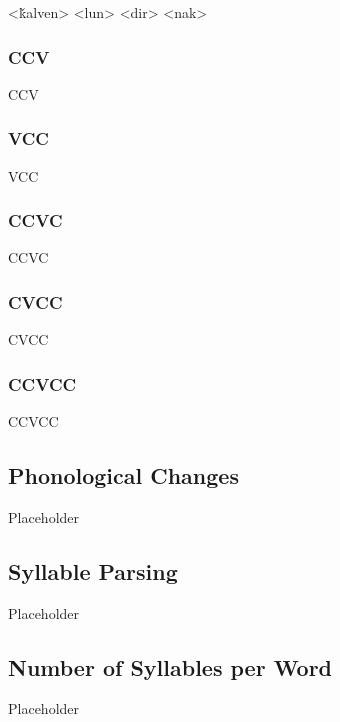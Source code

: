 	\a<ǩalven>   
	\a<lun>   
	\a<dir>   
	\a<nak>   
\xe

\subsubsection{CCV}

CCV

\subsubsection{VCC}

VCC

\subsubsection{CCVC}

CCVC

\subsubsection{CVCC}

CVCC

\subsubsection{CCVCC}

CCVCC

\subsection{Phonological Changes}
\label{subsec:tvk-phone-changes}

Placeholder

\subsection{Syllable Parsing}
\label{subsec:tvk-syll-parse}

Placeholder

\subsection{Number of Syllables per Word}
\label{subsec:tvk-num-syll}

Placeholder

